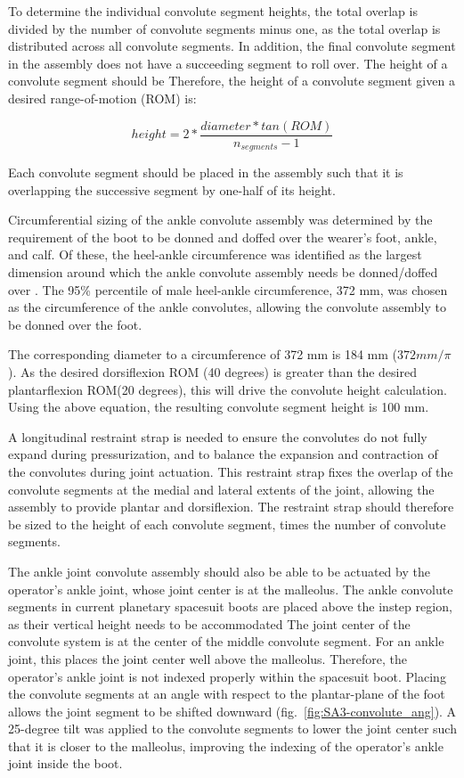 \documentclass[defaultstyle,11pt]{comps}
\begin{document}
To determine the individual convolute segment heights, the total overlap is divided by the number of convolute segments minus one, as the total overlap is distributed across all convolute segments.
In addition, the final convolute segment in the assembly does not have a succeeding segment to roll over.
The height of a convolute segment should be
Therefore, the height of a convolute segment given a desired range-of-motion (ROM) is:

\begin{equation}{
height = 2*\frac{diameter * tan(ROM)}{n_{segments}-1}
}\end{equation}

Each convolute segment should be placed in the assembly such that it is overlapping the successive segment by one-half of its height.

Circumferential sizing of the ankle convolute assembly was determined by the requirement of the boot to be donned and doffed over the wearer's foot, ankle, and calf.
Of these, the heel-ankle circumference was identified as the largest dimension around which the ankle convolute assembly needs be donned/doffed over \citep{Gordon2014}.
The 95\% percentile of male heel-ankle circumference, 372 mm, was chosen as the circumference of the ankle convolutes, allowing the convolute assembly to be donned over the foot.

The corresponding diameter to a circumference of 372 mm is 184 mm (\(372mm/\pi\)).
As the desired dorsiflexion ROM (40 degrees) is greater than the desired plantarflexion ROM(20 degrees), this will drive the convolute height calculation.
Using the above equation, the resulting convolute segment height is 100 mm.

A longitudinal restraint strap is needed to ensure the convolutes do not fully expand during pressurization, and to balance the expansion and contraction of the convolutes during joint actuation.
This restraint strap fixes the overlap of the convolute segments at the medial and lateral extents of the joint, allowing the assembly to provide plantar and dorsiflexion.
The restraint strap should therefore be sized to the height of each convolute segment, times the number of convolute segments.

The ankle joint convolute assembly should also be able to be actuated by the operator's ankle joint, whose joint center is at the malleolus.
The ankle convolute segments in current planetary spacesuit boots are placed above the instep region, as their vertical height needs to be accommodated
The joint center of the convolute system is at the center of the middle convolute segment.
For an ankle joint, this places the joint center well above the malleolus.
Therefore, the operator's ankle joint is not indexed properly within the spacesuit boot.
Placing the convolute segments at an angle with respect to the plantar-plane of the foot allows the joint segment to be shifted downward (fig.~\ref{fig:SA3-convolute_ang}).
A 25-degree tilt was applied to the convolute segments to lower the joint center such that it is closer to the malleolus, improving the indexing of the operator's ankle joint inside the boot.
\end{document}
